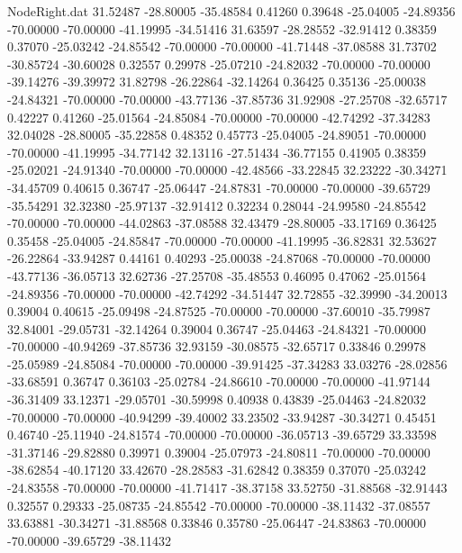 \begin{filecontents}{NodeRight.dat}
  31.52487  -28.80005  -35.48584     0.41260    0.39648  -25.04005  -24.89356  -70.00000  -70.00000  -41.19995  -34.51416
  31.63597  -28.28552  -32.91412     0.38359    0.37070  -25.03242  -24.85542  -70.00000  -70.00000  -41.71448  -37.08588
  31.73702  -30.85724  -30.60028     0.32557    0.29978  -25.07210  -24.82032  -70.00000  -70.00000  -39.14276  -39.39972
  31.82798  -26.22864  -32.14264     0.36425    0.35136  -25.00038  -24.84321  -70.00000  -70.00000  -43.77136  -37.85736
  31.92908  -27.25708  -32.65717     0.42227    0.41260  -25.01564  -24.85084  -70.00000  -70.00000  -42.74292  -37.34283
  32.04028  -28.80005  -35.22858     0.48352    0.45773  -25.04005  -24.89051  -70.00000  -70.00000  -41.19995  -34.77142
  32.13116  -27.51434  -36.77155     0.41905    0.38359  -25.02021  -24.91340  -70.00000  -70.00000  -42.48566  -33.22845
  32.23222  -30.34271  -34.45709     0.40615    0.36747  -25.06447  -24.87831  -70.00000  -70.00000  -39.65729  -35.54291
  32.32380  -25.97137  -32.91412     0.32234    0.28044  -24.99580  -24.85542  -70.00000  -70.00000  -44.02863  -37.08588
  32.43479  -28.80005  -33.17169     0.36425    0.35458  -25.04005  -24.85847  -70.00000  -70.00000  -41.19995  -36.82831
  32.53627  -26.22864  -33.94287     0.44161    0.40293  -25.00038  -24.87068  -70.00000  -70.00000  -43.77136  -36.05713
  32.62736  -27.25708  -35.48553     0.46095    0.47062  -25.01564  -24.89356  -70.00000  -70.00000  -42.74292  -34.51447
  32.72855  -32.39990  -34.20013     0.39004    0.40615  -25.09498  -24.87525  -70.00000  -70.00000  -37.60010  -35.79987
  32.84001  -29.05731  -32.14264     0.39004    0.36747  -25.04463  -24.84321  -70.00000  -70.00000  -40.94269  -37.85736
  32.93159  -30.08575  -32.65717     0.33846    0.29978  -25.05989  -24.85084  -70.00000  -70.00000  -39.91425  -37.34283
  33.03276  -28.02856  -33.68591     0.36747    0.36103  -25.02784  -24.86610  -70.00000  -70.00000  -41.97144  -36.31409
  33.12371  -29.05701  -30.59998     0.40938    0.43839  -25.04463  -24.82032  -70.00000  -70.00000  -40.94299  -39.40002
  33.23502  -33.94287  -30.34271     0.45451    0.46740  -25.11940  -24.81574  -70.00000  -70.00000  -36.05713  -39.65729
  33.33598  -31.37146  -29.82880     0.39971    0.39004  -25.07973  -24.80811  -70.00000  -70.00000  -38.62854  -40.17120
  33.42670  -28.28583  -31.62842     0.38359    0.37070  -25.03242  -24.83558  -70.00000  -70.00000  -41.71417  -38.37158
  33.52750  -31.88568  -32.91443     0.32557    0.29333  -25.08735  -24.85542  -70.00000  -70.00000  -38.11432  -37.08557
  33.63881  -30.34271  -31.88568     0.33846    0.35780  -25.06447  -24.83863  -70.00000  -70.00000  -39.65729  -38.11432

\end{filecontents}
